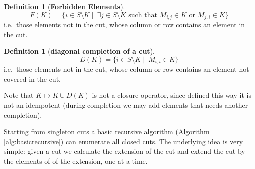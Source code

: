 \documentclass{article}
\theoremstyle{plain}
\theoremstyle{definition}
\newtheorem{definition}[theorem]{Definition}
\begin{document}
\begin{definition}[\textbf{Forbidden Elements}]
$$F(K)=\{i\in S\setminus K \mid\ \exists j\in S\setminus K \text{ such that } M_{i,j}\in K \text{ or } M_{j,i}\in K\} $$
\noindent i.e.\ those elements not in the cut, whose column or row contains an element in the cut.
\end{definition}



\begin{definition}[\textbf{diagonal completion of a cut}]
$$D(K)=\{i\in S\setminus K \mid\ M_{i,i}\in K \} $$
\noindent i.e.\ those elements not in the cut, whose column or row contains an element not covered in the cut.
\end{definition}


Note that $K\mapsto K\cup D(K)$ is not a closure operator, since defined this way it is not an idempotent (during completion we may add elements that needs another completion).

 Starting from singleton cuts a basic recursive algorithm (Algorithm \ref{alg:basicrecursive}) can enumerate all closed cuts. The underlying idea is very simple: given a cut we calculate the extension of the cut and extend the cut by the elements of of the extension, one at a time. 
\end{document}

